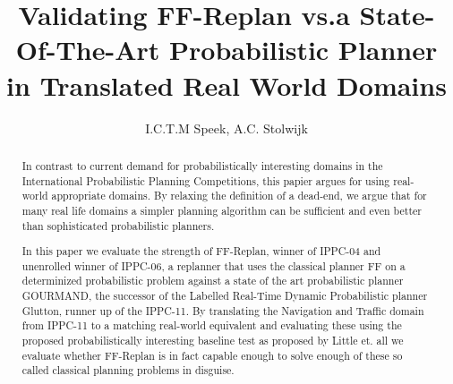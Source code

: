 \documentclass[runningheads,a4paper]{llncs}
\begin{document}
\mainmatter%

\title{Validating FF-Replan vs.\@ a State-Of-The-Art Probabilistic Planner in Translated Real World Domains}


\author{I.C.T.M Speek, A.C. Stolwijk}

%



\maketitle


\begin{abstract}
	In contrast to current demand for probabilistically interesting domains in the International Probabilistic Planning Competitions, this papier argues for using real-world appropriate domains. By relaxing the definition of a dead-end, we argue that for many
real life domains a simpler planning algorithm can be sufficient and even better than sophisticated probabilistic planners.

In this paper we evaluate the strength of FF-Replan, winner of IPPC-04 and unenrolled winner of IPPC-06, a replanner that uses the classical planner FF on a determinized probabilistic problem against a state of the art probabilistic planner GOURMAND, the successor of the Labelled Real-Time Dynamic Probabilistic planner Glutton, runner up of the IPPC-11. By translating the Navigation and Traffic domain from IPPC-11 to a matching real-world equivalent and evaluating these using the proposed probabilistically interesting baseline test as proposed by Little et. all we evaluate whether FF-Replan is in fact capable enough to solve enough of these so called classical planning problems in disguise.
\end{abstract}
\end{document}
